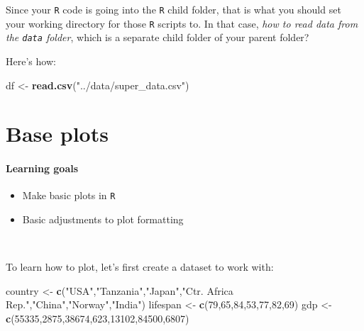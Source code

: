 \documentclass[]{book}
\newenvironment{Shaded}{\begin{snugshade}}{\end{snugshade}}
\newcommand{\DecValTok}[1]{\textcolor[rgb]{0.00,0.00,0.81}{#1}}
\newcommand{\KeywordTok}[1]{\textcolor[rgb]{0.13,0.29,0.53}{\textbf{#1}}}
\newcommand{\NormalTok}[1]{#1}
\newcommand{\StringTok}[1]{\textcolor[rgb]{0.31,0.60,0.02}{#1}}
\providecommand{\tightlist}{%
  \setlength{\itemsep}{0pt}\setlength{\parskip}{0pt}}
\begin{document}
Since your \texttt{R} code is going into the \texttt{R} child folder, that is what you should set your working directory for those \texttt{R} scripts to. In that case, \emph{how to read data from the \texttt{data} folder}, which is a separate child folder of your parent folder?

Here's how:

\begin{Shaded}
\begin{Highlighting}[]
\NormalTok{df <-}\StringTok{ }\KeywordTok{read.csv}\NormalTok{(}\StringTok{"../data/super_data.csv"}\NormalTok{)}
\end{Highlighting}
\end{Shaded}

\hypertarget{base-plots}{%
\chapter{Base plots}\label{base-plots}}

\hypertarget{learning-goals-8}{%
\subsubsection*{Learning goals}\label{learning-goals-8}}

\begin{itemize}
\tightlist
\item
  Make basic plots in \texttt{R}
\item
  Basic adjustments to plot formatting
\end{itemize}

~

To learn how to plot, let's first create a dataset to work with:

\begin{Shaded}
\begin{Highlighting}[]
\NormalTok{country <-}\StringTok{ }\KeywordTok{c}\NormalTok{(}\StringTok{"USA"}\NormalTok{,}\StringTok{"Tanzania"}\NormalTok{,}\StringTok{"Japan"}\NormalTok{,}\StringTok{"Ctr. Africa Rep."}\NormalTok{,}\StringTok{"China"}\NormalTok{,}\StringTok{"Norway"}\NormalTok{,}\StringTok{"India"}\NormalTok{)}
\NormalTok{lifespan <-}\StringTok{ }\KeywordTok{c}\NormalTok{(}\DecValTok{79}\NormalTok{,}\DecValTok{65}\NormalTok{,}\DecValTok{84}\NormalTok{,}\DecValTok{53}\NormalTok{,}\DecValTok{77}\NormalTok{,}\DecValTok{82}\NormalTok{,}\DecValTok{69}\NormalTok{)}
\NormalTok{gdp <-}\StringTok{ }\KeywordTok{c}\NormalTok{(}\DecValTok{55335}\NormalTok{,}\DecValTok{2875}\NormalTok{,}\DecValTok{38674}\NormalTok{,}\DecValTok{623}\NormalTok{,}\DecValTok{13102}\NormalTok{,}\DecValTok{84500}\NormalTok{,}\DecValTok{6807}\NormalTok{)}
\end{Highlighting}
\end{Shaded}
\end{document}
